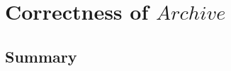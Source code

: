 \chapter[$Archive$]{Correctness of $Archive$}\label{ch24}


\newpage
\section{Summary}\label{ch24.summary}

\ldefsummary %
\lthmsummary %
\lthmaddeddefsummary %
\lthmaddedthmsummary %
\lzevessummary %
